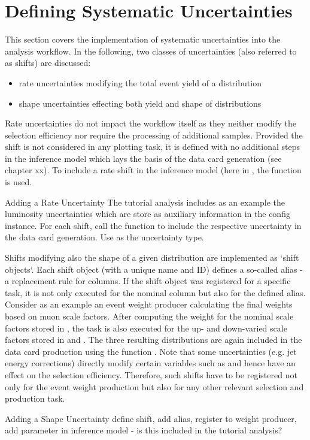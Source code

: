 \section{Defining Systematic Uncertainties}\label{sec:shifts}
This section covers the implementation of systematic uncertainties into the analysis workflow. In the following, two classes of uncertainties (also referred to as shifts) are discussed:

\begin{itemize}
    \item rate uncertainties modifying the total event yield of a distribution
    \item shape uncertainties effecting both yield and shape of distributions
\end{itemize}

Rate uncertainties do not impact the workflow itself as they neither modify the selection efficiency nor require the processing of additional samples. Provided the shift is not considered in any plotting task, it is defined with no additional steps in the inference model which lays the basis of the data card generation (see chapter xx). To include a rate shift in the inference model (here in , the function  is used.\\ 

\begin{exercise}{Adding a Rate Uncertainty}
	The tutorial analysis includes as an example the luminosity uncertainties which are store as auxiliary information in the config instance. For each shift, call the function  to include the respective uncertainty in the data card generation. Use  as the uncertainty type.
\end{exercise}
\vspace{0.5cm}

Shifts modifying also the shape of a given distribution are implemented as `shift objects`. Each shift object (with a unique name and ID) defines a so-called alias - a replacement rule for columns. If the shift object was registered for a specific task, it is not only executed for the nominal column but also for the defined alias. Consider as an example an event weight producer calculating the final weights based on muon scale factors. After computing the weight for the nominal scale factors stored in , the task is also executed for the up- and down-varied scale factors stored in  and . The three resulting distributions are again included in the data card production using the function . Note that some uncertainties (e.g. jet energy corrections) directly modify certain variables such as  and hence have an effect on the selection efficiency. Therefore, such shifts have to be registered not only for the event weight production but also for any other relevant selection and production task.\\

\begin{exercise}{Adding a Shape Uncertainty}
    define shift, add alias, register to weight producer, add parameter in inference model - is this included in the tutorial analysis?
\end{exercise}
